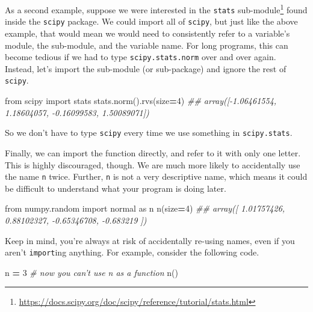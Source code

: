 \documentclass[12pt,krantz2]{krantz}
\makeatletter
\newenvironment{Shaded}{\begin{snugshade}}{\end{snugshade}}
\newcommand{\CommentTok}[1]{\textcolor[rgb]{0.37,0.37,0.37}{\textit{#1}}}
\newcommand{\DecValTok}[1]{\textcolor[rgb]{0.06,0.06,0.06}{#1}}
\newcommand{\ImportTok}[1]{#1}
\newcommand{\NormalTok}[1]{#1}
\newcommand{\OperatorTok}[1]{\textcolor[rgb]{0.43,0.43,0.43}{\textbf{#1}}}
\renewcommand{\href}[2]{#2\footnote{\url{#1}}}
\newenvironment{kframe}{%
\medskip{}
\setlength{\fboxsep}{.8em}
 \def\at@end@of@kframe{}%
 \ifinner\ifhmode%
  \def\at@end@of@kframe{\end{minipage}}%
  \begin{minipage}{\columnwidth}%
 \fi\fi%
 \def\FrameCommand##1{\hskip\@totalleftmargin \hskip-\fboxsep
 \colorbox{shadecolor}{##1}\hskip-\fboxsep
     \hskip-\linewidth \hskip-\@totalleftmargin \hskip\columnwidth}%
 \MakeFramed {\advance\hsize-\width
   \@totalleftmargin\z@ \linewidth\hsize
   \@setminipage}}%
 {\par\unskip\endMakeFramed%
 \at@end@of@kframe}
\renewenvironment{Shaded}{\begin{kframe}}{\end{kframe}}
\makeatother
\begin{document}
As a second example, suppose we were interested in the \href{https://docs.scipy.org/doc/scipy/reference/tutorial/stats.html}{\texttt{stats} sub-module} found inside the \texttt{scipy} package. We could import all of \texttt{scipy}, but just like the above example, that would mean we would need to consistently refer to a variable's module, the sub-module, and the variable name. For long programs, this can become tedious if we had to type \texttt{scipy.stats.norm} over and over again. Instead, let's import the sub-module (or sub-package) and ignore the rest of \texttt{scipy}.

\begin{Shaded}
\begin{Highlighting}[]
\ImportTok{from}\NormalTok{ scipy }\ImportTok{import}\NormalTok{ stats}
\NormalTok{stats.norm().rvs(size}\OperatorTok{=}\DecValTok{4}\NormalTok{)}
\CommentTok{## array([-1.06461554,  1.18604057, -0.16099583,  1.50089071])}
\end{Highlighting}
\end{Shaded}

So we don't have to type \texttt{scipy} every time we use something in \texttt{scipy.stats}.

Finally, we can import the function directly, and refer to it with only one letter. This is highly discouraged, though. We are much more likely to accidentally use the name \texttt{n} twice. Further, \texttt{n} is not a very descriptive name, which means it could be difficult to understand what your program is doing later.

\begin{Shaded}
\begin{Highlighting}[]
\ImportTok{from}\NormalTok{ numpy.random }\ImportTok{import}\NormalTok{ normal }\ImportTok{as}\NormalTok{ n}
\NormalTok{n(size}\OperatorTok{=}\DecValTok{4}\NormalTok{)}
\CommentTok{## array([ 1.01757426,  0.88102327, -0.65346708, -0.683219  ])}
\end{Highlighting}
\end{Shaded}

Keep in mind, you're always at risk of accidentally re-using names, even if you aren't \texttt{import}ing anything. For example, consider the following code.

\begin{Shaded}
\begin{Highlighting}[]
\NormalTok{n }\OperatorTok{=} \DecValTok{3} \CommentTok{# now you can't use n as a function }
\NormalTok{n()   }
\end{Highlighting}
\end{Shaded}
\end{document}
